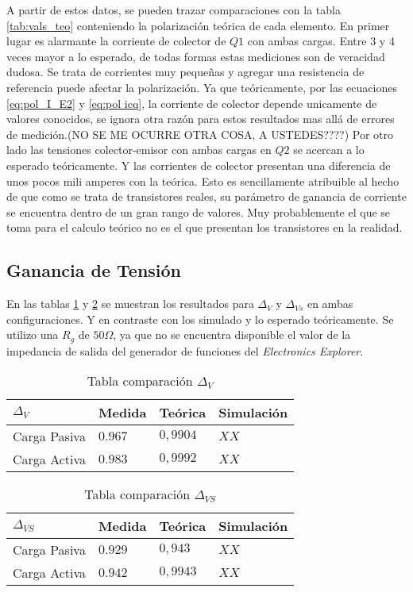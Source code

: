 A partir de estos datos, se pueden trazar comparaciones con la tabla \ref{tab:vals_teo} conteniendo la polarización teórica de cada elemento. En primer lugar es alarmante la corriente de colector de $Q1$ con ambas cargas. Entre 3 y 4 veces mayor a lo esperado, de todas formas estas mediciones son de veracidad dudosa. Se trata de corrientes muy pequeñas y agregar una resistencia de referencia puede afectar la polarización.
Ya que teóricamente, por las ecuaciones \ref{eq:pol_I_E2} y \ref{eq:pol icq}, la corriente de colector depende unicamente de valores conocidos, se ignora otra razón para estos resultados mas allá de errores de medición.(NO SE ME OCURRE OTRA COSA, A USTEDES????)
Por otro lado las tensiones colector-emisor con ambas cargas en $Q2$ se acercan a lo esperado teóricamente. Y las corrientes de colector presentan una diferencia de unos pocos mili amperes con la teórica. Esto es sencillamente atribuible al hecho de que como se trata de transistores reales, su parámetro de ganancia de corriente se encuentra dentro de un gran rango de valores. Muy probablemente el que se toma para el calculo teórico no es el que presentan los transistores en la realidad.


\subsection{Ganancia de Tensión}

En las tablas \ref{table:comp av} y \ref{table:comp avs} se muestran los resultados para $\Delta_V$ y $\Delta_{Vs}$ en ambas configuraciones. Y en contraste con los simulado y lo esperado teóricamente.
Se utilizo una $R_g$ de $50\Omega$, ya que no se encuentra disponible el valor de la impedancia de salida del generador de funciones del \textit{Electronics Explorer}.

\begin{table}[ht]
    \centering
    \begin{tabular}{|l|l|l|l|}
    \hline
    $\Delta_V $  & Medida   & Teórica  & Simulación \\ \hline
    Carga Pasiva & $0.967$  & $0,9904$ &  $XX$       \\ \hline
    Carga Activa & $0.983$  & $0,9992$ &  $XX$          \\ \hline
    \end{tabular}
    \caption{Tabla comparación $\Delta_V$}\label{table:comp av}
\end{table}

\begin{table}[ht]
    \centering
    \begin{tabular}{|l|l|l|l|}
    \hline
    $\Delta_{VS} $  & Medida   & Teórica  & Simulación \\ \hline
    Carga Pasiva & $0.929$  & $0,943$ &  $XX$       \\ \hline
    Carga Activa & $0.942$  & $0,9943$ &  $XX$          \\ \hline
    \end{tabular}
    \caption{Tabla comparación $\Delta_{VS}$}\label{table:comp avs}
\end{table}


